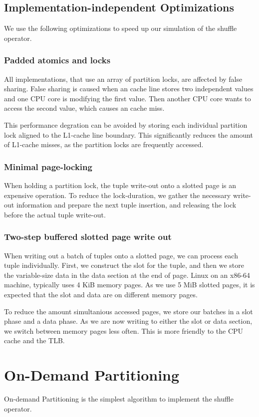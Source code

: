 \subsection{Implementation-independent Optimizations}
We use the following optimizations to speed up our simulation of the shuffle operator.
\subsubsection{Padded atomics and locks}
All implementations, that use an array of partition locks, are affected by false sharing.
False sharing is caused when an cache line stores two independent values and one \ac{CPU} core is modifying the first value.
Then another CPU core wants to access the second value, which causes an cache miss.

This performance degration can be avoided by storing each individual partition lock aligned to the L1-cache line boundary.
This significantly reduces the amount of L1-cache misses, as the partition locks are frequently accessed.

\subsubsection{Minimal page-locking}
When holding a partition lock, the tuple write-out onto a slotted page is an expensive operation.
To reduce the lock-duration, we gather the necessary write-out information and prepare the next tuple insertion, and releasing the lock before the actual tuple write-out.

\subsubsection{Two-step buffered slotted page write out}
When writing out a batch of tuples onto a slotted page, we can process each tuple individually.
First, we construct the slot for the tuple, and then we store the variable-size data in the data section at the end of page.
Linux on an x86-64 machine, typically uses 4 KiB memory pages.
As we use 5 MiB slotted pages, it is expected that the slot and data are on different memory pages.

To reduce the amount simultanious accessed pages, we store our batches in a slot phase and a data phase.
As we are now writing to either the slot or data section, we switch between memory pages less often.
This is more friendly to the \ac{CPU} cache and the \ac{TLB}.

\section{On-Demand Partitioning} \label{section-On-Demand-Partitioning}
On-demand Partitioning is the simplest algorithm to implement the shuffle operator.

